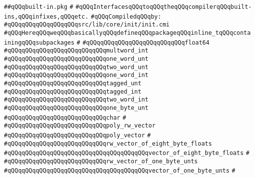 \label{src/lib/core/init/built-in.pkg}
\verb|##qQQqbuilt-in.pkg|\newline
\verb|#|\newline
\verb|#qQQqInterfacesqQQqtoqQQqtheqQQqcompilerqQQqbuilt-ins,qQQqinfixes,qQQqetc.|\newline
\newline
\verb|#qQQqCompiledqQQqby:|\newline
\verb|#qQQqqQQqqQQqqQQqqQQqsrc/lib/core/init/init.cmi|\newline
\newline
\verb|#qQQqHereqQQqweqQQqbasicallyqQQqdefineqQQqpackageqQQqinline_tqQQqcontainingqQQqsubpackages|\newline
\verb|#|\newline
\verb|#qQQqqQQqqQQqqQQqqQQqqQQqqQQqfloat64|\newline
\verb|#qQQqqQQqqQQqqQQqqQQqqQQqqQQqmultword_int|\newline
\verb|#qQQqqQQqqQQqqQQqqQQqqQQqqQQqone_word_unt|\newline
\verb|#qQQqqQQqqQQqqQQqqQQqqQQqqQQqtwo_word_unt|\newline
\verb|#qQQqqQQqqQQqqQQqqQQqqQQqqQQqone_word_int|\newline
\verb|#qQQqqQQqqQQqqQQqqQQqqQQqqQQqtagged_unt|\newline
\verb|#qQQqqQQqqQQqqQQqqQQqqQQqqQQqtagged_int|\newline
\verb|#qQQqqQQqqQQqqQQqqQQqqQQqqQQqtwo_word_int|\newline
\verb|#qQQqqQQqqQQqqQQqqQQqqQQqqQQqone_byte_unt|\newline
\verb|#qQQqqQQqqQQqqQQqqQQqqQQqqQQqchar|\newline
\verb|#|\newline
\verb|#qQQqqQQqqQQqqQQqqQQqqQQqqQQqpoly_rw_vector|\newline
\verb|#qQQqqQQqqQQqqQQqqQQqqQQqqQQqpoly_vector|\newline
\verb|#|\newline
\verb|#qQQqqQQqqQQqqQQqqQQqqQQqqQQqrw_vector_of_eight_byte_floats|\newline
\verb|#qQQqqQQqqQQqqQQqqQQqqQQqqQQqqQQqqQQqqQQqvector_of_eight_byte_floats|\newline
\verb|#|\newline
\verb|#qQQqqQQqqQQqqQQqqQQqqQQqqQQqrw_vector_of_one_byte_unts|\newline
\verb|#qQQqqQQqqQQqqQQqqQQqqQQqqQQqqQQqqQQqqQQqvector_of_one_byte_unts|\newline
\verb|#|\newline
